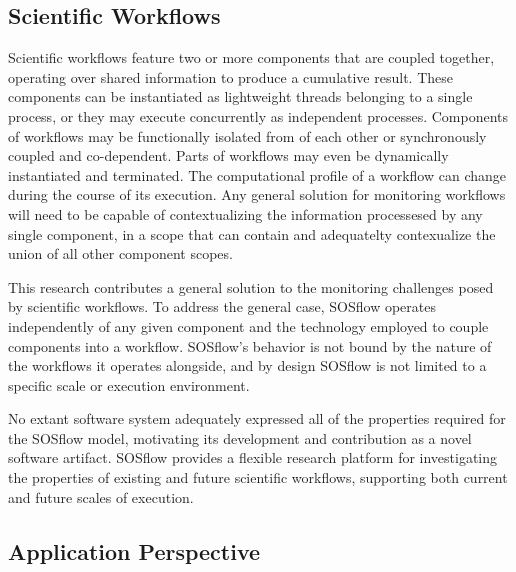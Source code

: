 \subsection{Scientific Workflows} %
%
Scientific workflows feature two or more components that are coupled
together, operating over shared information to produce a cumulative
result.
%
These components can be instantiated as lightweight threads belonging
to a single process, or they may execute concurrently as independent
processes.
%
Components of workflows may be functionally isolated from of each
other or synchronously coupled and co-dependent.
%
Parts of workflows may even be dynamically instantiated and
terminated.
%
The computational profile of a workflow can change during the course
of its execution.
%
Any general solution for monitoring workflows will need to be capable
of contextualizing the information processesed by any single
component, in a scope that can contain and adequatelty contexualize
the union of all other component scopes.
%
\par
%
This research contributes a general solution to the monitoring
challenges posed by scientific workflows.
%
To address the general case, SOSflow operates independently of any
given component and the technology employed to couple components into
a workflow.
%
SOSflow's behavior is not bound by the nature of the workflows it
operates alongside, and by design SOSflow is not limited to a specific
scale or execution environment.
%
%
%
\par
%
No extant software system adequately expressed all of the properties
required for the SOSflow model, motivating its development and
contribution as a novel software artifact.
%
SOSflow provides a flexible research platform for investigating the
properties of existing and future scientific workflows, supporting
both current and future scales of execution.
%
\subsection{Application Perspective} %
%
%
